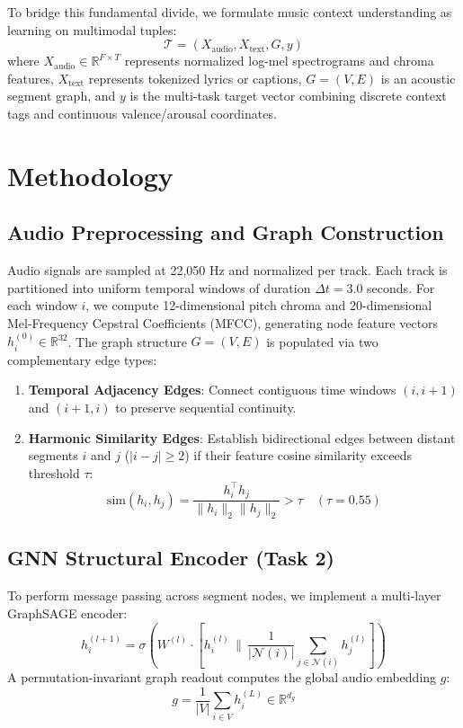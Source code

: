 \documentclass{article}
\begin{document}
To bridge this fundamental divide, we formulate music context understanding as learning on multimodal tuples:
\begin{equation}
\mathcal{T} = (X_{\text{audio}}, X_{\text{text}}, G, y)
\end{equation}
where $X_{\text{audio}} \in \mathbb{R}^{F \times T}$ represents normalized log-mel spectrograms and chroma features, $X_{\text{text}}$ represents tokenized lyrics or captions, $G = (V, E)$ is an acoustic segment graph, and $y$ is the multi-task target vector combining discrete context tags and continuous valence/arousal coordinates.

\section{Methodology}

\subsection{Audio Preprocessing and Graph Construction}
Audio signals are sampled at 22,050 Hz and normalized per track. Each track is partitioned into uniform temporal windows of duration $\Delta t = 3.0$ seconds. For each window $i$, we compute 12-dimensional pitch chroma and 20-dimensional Mel-Frequency Cepstral Coefficients (MFCC), generating node feature vectors $h_i^{(0)} \in \mathbb{R}^{32}$.
The graph structure $G = (V, E)$ is populated via two complementary edge types:
\begin{enumerate}
    \item \textbf{Temporal Adjacency Edges}: Connect contiguous time windows $(i, i+1)$ and $(i+1, i)$ to preserve sequential continuity.
    \item \textbf{Harmonic Similarity Edges}: Establish bidirectional edges between distant segments $i$ and $j$ ($|i - j| \ge 2$) if their feature cosine similarity exceeds threshold $\tau$:
    \begin{equation}
        \text{sim}(h_i, h_j) = \frac{h_i^\top h_j}{\|h_i\|_2 \|h_j\|_2} > \tau \quad (\tau = 0.55)
    \end{equation}
\end{enumerate}

\subsection{GNN Structural Encoder (Task 2)}
To perform message passing across segment nodes, we implement a multi-layer GraphSAGE encoder:
\begin{equation}
h_i^{(l+1)} = \sigma \left( W^{(l)} \cdot \left[ h_i^{(l)} \,\|\, \frac{1}{|\mathcal{N}(i)|} \sum_{j \in \mathcal{N}(i)} h_j^{(l)} \right] \right)
\end{equation}
A permutation-invariant graph readout computes the global audio embedding $g$:
\begin{equation}
g = \frac{1}{|V|} \sum_{i \in V} h_i^{(L)} \in \mathbb{R}^{d_g}
\end{equation}
\end{document}
